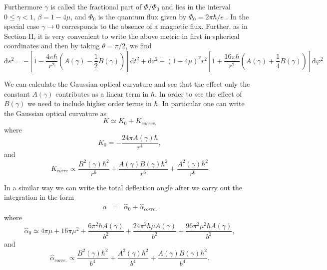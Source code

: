 \documentclass[preprint,superscriptaddress,amsfonts,amssymb,amsmath,showpacs]{revtex4}
\begin{document}
Furthermore $\gamma$ is called the fractional part of ${\Phi/\Phi_0}$ and lies in the interval $0 \leq \gamma <1$, $\beta=1-4\mu$, and $\Phi_0$ is the quantum flux given by $\Phi_0=2 \pi \hbar / e$ \cite{guimares,dowker,frolov,guimares2}. In the special case $\gamma \to 0$ corresponds to the absence of a magnetic flux. Further, as in Section II, it is very convenient to write the above metric in first in spherical coordinates and then  by taking $\theta=\pi/2$, we find
\begin{equation}
\mathrm{d}s^2=-\left[1-\frac{4 \pi  \hbar }{r^2}\left(A(\gamma)-\frac{1}{2}B(\gamma) \right)\right]\mathrm{d}t^2+\mathrm{d}r^2+(1-4\mu)^2 r^2 \left[1+\frac{16 \pi  \hbar}{r^2}\left(A(\gamma)+\frac{1}{4}B(\gamma)\right)\right]\mathrm{d}\varphi^2
\end{equation}

We can calculate the Gaussian optical curvature and see that the effect only the constant $A(\gamma)$ contributes as a linear term in $\hbar$. In order to see the effect of $B(\gamma)$ we need to include higher order terms in $\hbar$. In particular one can write the Gaussian optical curvature as  
\begin{equation}
K \simeq K_0+K_{correc.} 
\end{equation}
where 
\begin{equation}
K_0=-\frac{24 \pi A(\gamma) \hbar}{r^4}, 
\end{equation}
and 
\begin{equation}
 K_{corre} \propto \frac{B^2(\gamma) \hbar^2}{r^6} +\frac{A(\gamma)B(\gamma) \hbar^2}{r^6}+\frac{A^2(\gamma) \hbar^2}{r^6}
\end{equation}

In a similar way we can write the total deflection angle after we carry out the integration in the form
\begin{eqnarray}
\hat{\alpha}&=& \hat{\alpha}_0+\hat{\alpha}_{corre.}
\end{eqnarray}
where 
\begin{equation}\label{def11}
\hat{\alpha}_0\simeq 4 \pi \mu+ 16 \pi \mu^2+\frac{6 \pi^2 \hbar A(\gamma)}{b^2}+\frac{24 \pi^2 \hbar \mu A(\gamma)}{b^2}+\frac{96 \pi^2 \mu^2 \hbar A(\gamma)}{b^2},
\end{equation}
and 
\begin{equation}
\hat{\alpha}_{corre.} \propto \frac{B^2(\gamma) \hbar^2}{b^4}+ \frac{A^2(\gamma) \hbar^2}{b^4}+\frac{A(\gamma)B(\gamma) \hbar^2}{b^4}.
\end{equation}
\end{document}
